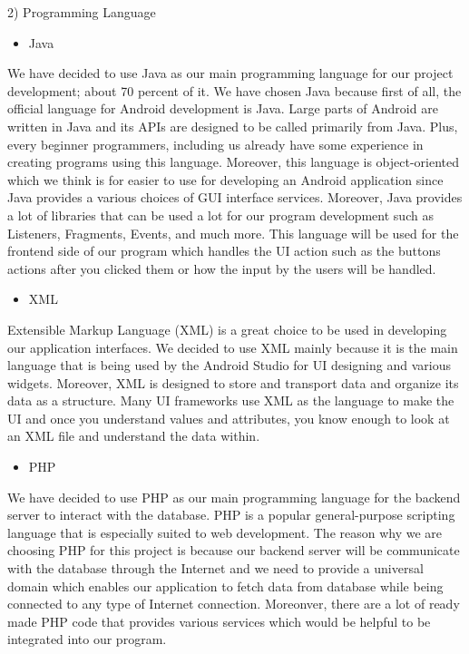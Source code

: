 \documentclass[conference]{IEEEtran}
\begin{document}
2) Programming Language\\
\begin{itemize}
\item Java\\
\end{itemize}
\par We have decided to use Java as our main programming language for our project development; about 70 percent of it. We have chosen Java because first of all, the official language for Android development is Java. Large parts of Android are written in Java and its APIs are designed to be called primarily from Java. Plus, every beginner programmers, including us already have some experience in creating programs using this language. Moreover, this language is object-oriented which we think is for easier to use for developing an Android application since Java provides a various choices of GUI interface services. Moreover, Java provides a lot of libraries that can be used a lot for our program development such as Listeners, Fragments, Events, and much more. This language will be used for the frontend side of our program which handles the UI action such as the buttons actions after you clicked them or how the input by the users will be handled.\\
\begin{itemize}
\item XML\\
\end{itemize}
\par Extensible Markup Language (XML) is a great choice to be used in developing our application interfaces. We decided to use XML mainly because it is the main language that is being used by the Android Studio for UI designing and various widgets. Moreover, XML is designed to store and transport data and organize its data as a structure. Many UI frameworks use XML as the language to make the UI and once  you understand values and attributes, you know enough to look at an XML file and understand the data within.\\
\begin{itemize}
\item PHP\\
\end{itemize}
\par We have decided to use PHP as our main programming language for the backend server to interact with the database. PHP is a popular general-purpose scripting language that is especially suited to web development. The reason why we are choosing PHP for this project is because our backend server will be communicate with the database through the Internet and we need to provide a universal domain which enables our application to fetch data from database while being connected to any type of Internet connection. Moreonver, there are a lot of ready made PHP code that provides various services which would be helpful to be integrated into our program.\\
\end{document}
